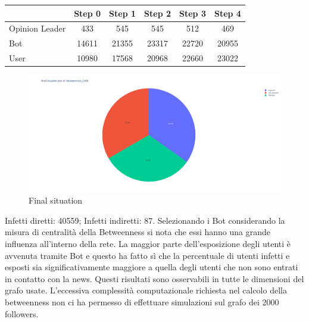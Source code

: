         \begin{table}[H]
            \centering
            \begin{tabular}{|l|c|c|c|c|c|}
            \hline
                           & Step 0 & Step 1 & Step 2 & Step 3 & Step 4 \\ \hline
            Opinion Leader & 433    & 545    & 545    & 512    & 469    \\ \hline
            Bot            & 14611  & 21355  & 23317  & 22720  & 20955  \\ \hline
            User           & 10980  & 17568  & 20968  & 22660  & 23022  \\ \hline
            \end{tabular}
        \end{table}
        
        \begin{figure}[H]
            \includegraphics[width=16cm]{resources/charts/btw_1500_pie.png}
            \caption{Final situation}
            \label{fig:btw_1500_pie}
        \end{figure}
        Infetti diretti: 40559;\newline
        Infetti indiretti: 87.
        \newline
        \newline
        Selezionando i Bot considerando la misura di centralità della Betweenness si nota che essi hanno una grande influenza all’interno della rete. La maggior parte dell’esposizione degli utenti è avvenuta tramite Bot e questo ha fatto sì che la percentuale di utenti infetti e esposti sia significativamente maggiore a quella degli utenti che non sono entrati in contatto con la news.
       \newline
        Questi risultati sono osservabili in tutte le dimensioni del grafo usate. L’eccessiva complessità computazionale richiesta nel calcolo della betweenness non ci ha permesso di effettuare simulazioni sul grafo dei 2000 followers.

